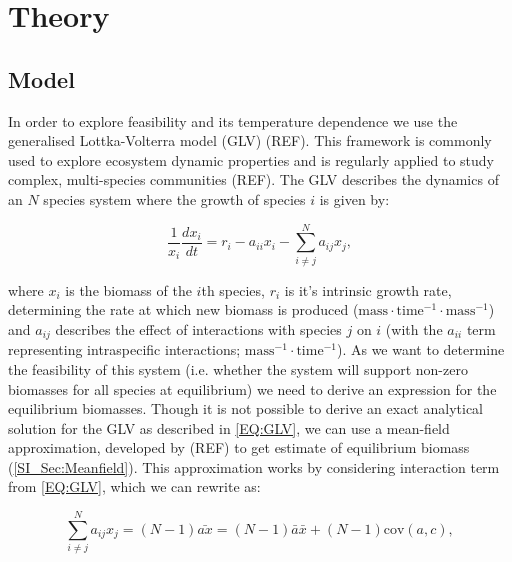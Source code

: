 \documentclass{article}
\begin{document}
\section{Theory}
\subsection{Model}
In order to explore feasibility and its temperature dependence we use the generalised Lottka-Volterra model (GLV) (REF). This framework is commonly used to explore ecosystem dynamic properties and is regularly applied to study complex, multi-species communities (REF). The GLV describes the dynamics of an $N$ species system where the growth of species $i$ is given by:

\begin{equation} \label{EQ:GLV}
  \frac{1}{x_i} \frac{dx_i}{dt} = r_i - a_{ii} x_i - \sum^N_{i \neq j} a_{ij} x_j, 
\end{equation}

where $x_i$ is the biomass of the $i$th species, $r_i$ is it's intrinsic growth rate, determining the rate at which new biomass is produced ($\text{mass} \cdot \text{time}^{-1} \cdot \text{mass}^{-1} $) and $a_{ij}$ describes the effect of interactions with species $j$ on $i$ (with the $a_{ii}$ term representing intraspecific interactions; $\text{mass}^{-1} \cdot \text{time}^{-1}$). As we want to determine the feasibility of this system (i.e. whether the system will support non-zero biomasses for all species at equilibrium) we need to derive an expression for the equilibrium biomasses. Though it is not possible to derive an exact analytical solution for the GLV as described in \cref{EQ:GLV}, we can use a mean-field approximation, developed by (REF) to get estimate of equilibrium biomass (\cref{SI_Sec:Meanfield}). This approximation works by considering interaction term from \cref{EQ:GLV}, which we can rewrite as:

\begin{equation} \label{EQ:mean_int} 
    \sum^N_{i \neq j} a_{ij} x_j = (N-1) \bar{a x} = (N-1) \bar{a} \bar{x} + (N-1) \text{cov}(a,c),
\end{equation}
\end{document}
